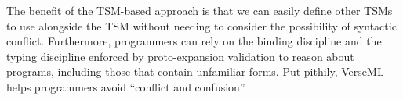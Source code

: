 The benefit of the TSM-based approach is that we can easily define other TSMs to use alongside the  TSM without needing to consider the possibility of syntactic conflict. Furthermore, programmers can rely on the binding discipline and the typing discipline enforced by proto-expansion validation to reason about programs, including those that contain unfamiliar forms. Put pithily, VerseML helps programmers avoid ``conflict and confusion''. 



